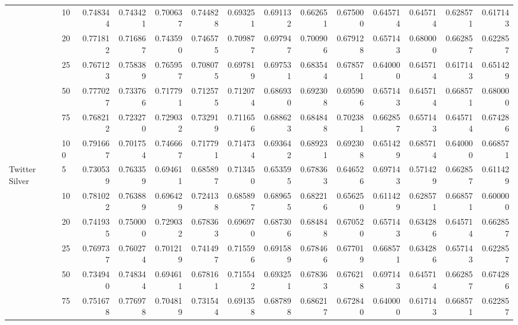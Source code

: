 \begin{tabular}{llrrrrrrrrrrrr}
               & 10  &        0.748344 &     0.743421 &  0.700637 &  0.744828 &        0.693251 &     0.691132 &  0.662651 &  0.675000 &        0.645714 &     0.645714 &  0.628571 &  0.617143 \\
               & 20  &        0.771812 &     0.716867 &  0.743590 &  0.746575 &        0.709877 &     0.697947 &  0.700906 &  0.679128 &        0.657143 &     0.680000 &  0.662857 &  0.622857 \\
               & 25  &        0.767123 &     0.758389 &  0.765957 &  0.708075 &        0.697819 &     0.697531 &  0.683544 &  0.678571 &        0.640000 &     0.645714 &  0.617143 &  0.651429 \\
               & 50  &        0.777027 &     0.733766 &  0.717791 &  0.712575 &        0.712074 &     0.686930 &  0.692308 &  0.695906 &        0.657143 &     0.645714 &  0.668571 &  0.680000 \\
               & 75  &        0.768212 &     0.723270 &  0.729032 &  0.732919 &        0.711656 &     0.688623 &  0.684848 &  0.702381 &        0.662857 &     0.657143 &  0.645714 &  0.674286 \\
               & 100 &        0.791667 &     0.701754 &  0.746667 &  0.717791 &        0.714734 &     0.693642 &  0.689231 &  0.692308 &        0.651429 &     0.685714 &  0.640000 &  0.668571 \\
Twitter Silver & 5   &        0.730539 &     0.763359 &  0.694611 &  0.685897 &        0.713450 &     0.653595 &  0.678363 &  0.646526 &        0.697143 &     0.571429 &  0.662857 &  0.611429 \\
               & 10  &        0.781022 &     0.763889 &  0.696429 &  0.724138 &        0.685897 &     0.689655 &  0.682216 &  0.656250 &        0.611429 &     0.628571 &  0.668571 &  0.600000 \\
               & 20  &        0.741935 &     0.750000 &  0.729032 &  0.678363 &        0.696970 &     0.687306 &  0.684848 &  0.670520 &        0.657143 &     0.634286 &  0.645714 &  0.662857 \\
               & 25  &        0.769737 &     0.760274 &  0.701219 &  0.741497 &        0.715596 &     0.691589 &  0.678466 &  0.677019 &        0.668571 &     0.634286 &  0.657143 &  0.622857 \\
               & 50  &        0.734940 &     0.748344 &  0.694611 &  0.678161 &        0.715542 &     0.693251 &  0.678363 &  0.676218 &        0.697143 &     0.645714 &  0.662857 &  0.674286 \\
               & 75  &        0.751678 &     0.776978 &  0.704819 &  0.731544 &        0.691358 &     0.687898 &  0.686217 &  0.672840 &        0.640000 &     0.617143 &  0.668571 &  0.622857 \\

\end{tabular}
